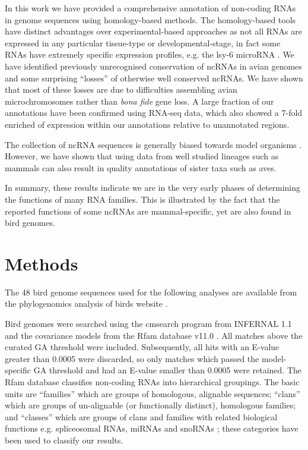 \documentclass[10pt]{bmc_article}
\newenvironment{bmcformat}{\begin{raggedright}\baselineskip20pt\sloppy\setboolean{publ}{false}}{\end{raggedright}\baselineskip20pt\sloppy}
\begin{document}
\begin{bmcformat}
In this work we have provided a comprehensive annotation of non-coding
RNAs in genome sequences using homology-based methods. The
homology-based tools have distinct advantages over experimental-based
approaches as not all RNAs are expressed in any particular tissue-type
or developmental-stage, in fact some RNAs have extremely specific
expression profiles, e.g. the lsy-6 microRNA \cite{Johnston:2003}.  We
have identified previously unrecognised conservation of ncRNAs in
avian genomes and some surprising ``losses'' of otherwise well
conserved ncRNAs. We have shown that most of these losses are due to
difficulties assembling avian microchromosomes rather than \emph{bona
  fide} gene loss. A large fraction of our annotations have been
confirmed using RNA-seq data, which also showed a 7-fold enriched of
expression within our annotations relative to unannotated regions.

The collection of ncRNA sequences is generally biased towards model
organisms \cite{Gardner:2010,Hoeppner:2012}. However, we have shown
that using data from well studied lineages such as mammals can also
result in quality annotations of sister taxa such as aves.

In summary, these results indicate we are in the very early phases of
determining the functions of many RNA families. This is illustrated by
the fact that the reported functions of some ncRNAs are
mammal-specific, yet are also found in bird genomes.


\section*{Methods}

The 48 bird genome sequences used for the following analyses are available from
the phylogenomics analysis of birds website \cite{birdphylogen}.

Bird genomes were searched using the cmsearch program from INFERNAL
1.1 and the covariance models from the Rfam database
v11.0 \cite{Gardner:2011a,Burge:2013}. All matches above the curated GA
threshold were included. Subsequently, all hits with an E-value
greater than 0.0005 were discarded, so only matches which passed the
model-specific GA threshold and had an E-value smaller than 0.0005
were retained. The Rfam database classifies non-coding RNAs into
hierarchical groupings. The basic units are ``families'' which are
groups of homologous, alignable sequences; ``clans'' which are groups
of un-alignable (or functionally distinct), homologous families; and
``classes'' which are groups of clans and families with related
biological functions e.g. spliceosomal RNAs, miRNAs and snoRNAs
\cite{Griffiths-Jones:2003,Griffiths-Jones:2005,Gardner:2009,Gardner:2011a,Burge:2013};
these categories have been used to classify our results.


\end{bmcformat}
\end{document}
